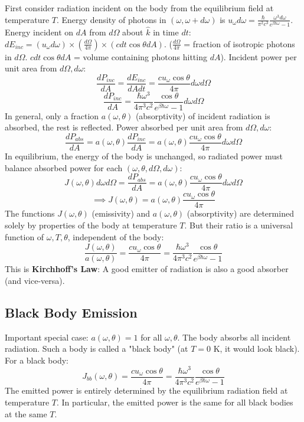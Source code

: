 \documentclass[11pt]{article}
\begin{document}
First consider radiation incident on the body from the equilibrium field at temperature $T$.
Energy density of photons in $(\omega, \omega+d\omega)$ is $u_\omega d\omega = \frac{\hbar}{\pi^2 c^3} \frac{\omega^3 d\omega}{e^{\beta\hbar\omega}-1}$.
Energy incident on $dA$ from $d\Omega$ about $\hat{k}$ in time $dt$:
$dE_{inc} = (u_\omega d\omega) \times (\frac{d\Omega}{4\pi}) \times (c dt \cos\theta dA)$.
($\frac{d\Omega}{4\pi}$ = fraction of isotropic photons in $d\Omega$. $c dt \cos\theta dA$ = volume containing photons hitting $dA$).
Incident power per unit area from $d\Omega, d\omega$:
\[ \frac{dP_{inc}}{dA} = \frac{dE_{inc}}{dA dt} = \frac{c u_\omega \cos\theta}{4\pi} d\omega d\Omega \]
\[ \frac{dP_{inc}}{dA} = \frac{\hbar \omega^3}{4\pi^3 c^2} \frac{\cos\theta}{e^{\beta\hbar\omega}-1} d\omega d\Omega \]
In general, only a fraction $a(\omega, \theta)$ (absorptivity) of incident radiation is absorbed, the rest is reflected.
Power absorbed per unit area from $d\Omega, d\omega$:
\[ \frac{dP_{abs}}{dA} = a(\omega, \theta) \frac{dP_{inc}}{dA} = a(\omega, \theta) \frac{c u_\omega \cos\theta}{4\pi} d\omega d\Omega \]
In equilibrium, the energy of the body is unchanged, so radiated power must balance absorbed power for each $(\omega, \theta, d\Omega, d\omega)$:
\[ J(\omega, \theta) d\omega d\Omega = \frac{dP_{abs}}{dA} = a(\omega, \theta) \frac{c u_\omega \cos\theta}{4\pi} d\omega d\Omega \]
\[ \implies J(\omega, \theta) = a(\omega, \theta) \frac{c u_\omega \cos\theta}{4\pi} \]
The functions $J(\omega, \theta)$ (emissivity) and $a(\omega, \theta)$ (absorptivity) are determined solely by properties of the body at temperature $T$. But their ratio is a universal function of $\omega, T, \theta$, independent of the body:
\[ \frac{J(\omega, \theta)}{a(\omega, \theta)} = \frac{c u_\omega \cos\theta}{4\pi} = \frac{\hbar \omega^3}{4\pi^3 c^2} \frac{\cos\theta}{e^{\beta\hbar\omega}-1} \]
This is \textbf{Kirchhoff's Law}: A good emitter of radiation is also a good absorber (and vice-versa).

\subsection*{Black Body Emission}
Important special case: $a(\omega, \theta) = 1$ for all $\omega, \theta$. The body absorbs all incident radiation. Such a body is called a "black body" (at $T=0$ K, it would look black).
For a black body:
\[ J_{bb}(\omega, \theta) = \frac{c u_\omega \cos\theta}{4\pi} = \frac{\hbar \omega^3}{4\pi^3 c^2} \frac{\cos\theta}{e^{\beta\hbar\omega}-1} \]
The emitted power is entirely determined by the equilibrium radiation field at temperature $T$. In particular, the emitted power is the same for all black bodies at the same $T$.
\end{document}
